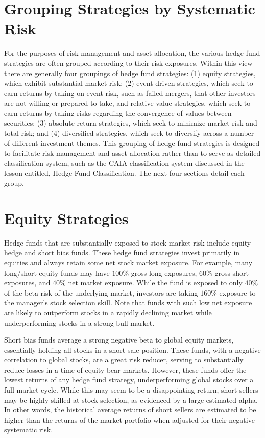 \documentclass[11pt]{article}
\begin{document}
\section*{Grouping Strategies by Systematic Risk}
For the purposes of risk management and asset allocation, the various hedge fund strategies are often grouped according to their risk exposures. Within this view there are generally four groupings of hedge fund strategies: (1) equity strategies, which exhibit substantial market risk; (2) event-driven strategies, which seek to earn returns by taking on event risk, such as failed mergers, that other investors are not willing or prepared to take, and relative value strategies, which seek to earn returns by taking risks regarding the convergence of values between securities; (3) absolute return strategies, which seek to minimize market risk and total risk; and (4) diversified strategies, which seek to diversify across a number of different investment themes. This grouping of hedge fund strategies is designed to facilitate risk management and asset allocation rather than to serve as detailed classification system, such as the CAIA classification system discussed in the lesson entitled, Hedge Fund Classification. The next four sections detail each group.

\section*{Equity Strategies}
Hedge funds that are substantially exposed to stock market risk include equity hedge and short bias funds. These hedge fund strategies invest primarily in equities and always retain some net stock market exposure. For example, many long/short equity funds may have $100 \%$ gross long exposures, $60 \%$ gross short exposures, and $40 \%$ net market exposure. While the fund is exposed to only $40 \%$ of the beta risk of the underlying market, investors are taking $160 \%$ exposure to the manager's stock selection skill. Note that funds with such low net exposure are likely to outperform stocks in a rapidly declining market while underperforming stocks in a strong bull market.

Short bias funds average a strong negative beta to global equity markets, essentially holding all stocks in a short sale position. These funds, with a negative correlation to global stocks, are a great risk reducer, serving to substantially reduce losses in a time of equity bear markets. However, these funds offer the lowest returns of any hedge fund strategy, underperforming global stocks over a full market cycle. While this may seem to be a disappointing return, short sellers may be highly skilled at stock selection, as evidenced by a large estimated alpha. In other words, the historical average returns of short sellers are estimated to be higher than the returns of the market portfolio when adjusted for their negative systematic risk.
\end{document}

